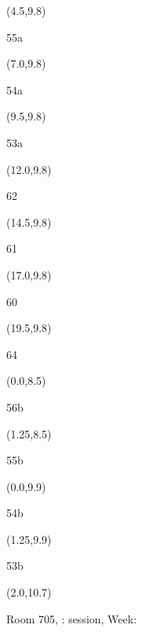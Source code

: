 \documentclass[a4paper]{article}
\newcommand{\myseat}[5]{%
\vspace{-0.1cm} \hspace{-0.5cm}
\parbox[t][2.2cm][t]{3.5cm}{%
\small #1 %
\begin{description}
\vspace{-0.1cm}
\item [ID:] #2
\vspace{-0.1cm}
\item [Team:] #3 \normalsize
\vspace{-0.1cm}
\item \normalsize #4 #5
\vspace{-0.1cm}
\end{description}
}
}
\begin{document}
\begin{CJK}{UTF8}{cyberbit}
\begin{textblock}{2.5}(4.5,9.8)
\textblockcolor{}
\myseat{55a}{}{}{}{}
\end{textblock}

\begin{textblock}{2.5}(7.0,9.8)
\textblockcolor{}
\myseat{54a}{}{}{}{}
\end{textblock}

\begin{textblock}{2.5}(9.5,9.8)
\textblockcolor{}
\myseat{53a}{}{}{}{}
\end{textblock}

\begin{textblock}{2.5}(12.0,9.8)
\textblockcolor{}
\myseat{62}{}{}{}{}
\end{textblock}

\begin{textblock}{2.5}(14.5,9.8)
\textblockcolor{}
\myseat{61}{}{}{}{}
\end{textblock}

\begin{textblock}{2.5}(17.0,9.8)
\textblockcolor{}
\myseat{60}{}{}{}{}
\end{textblock}

\begin{textblock}{2.5}(19.5,9.8)
\textblockcolor{}
\myseat{64}{}{}{}{}
\end{textblock}


\begin{textblock}{1.25}(0.0,8.5)
\textblockcolor{}
\myseat{56b}{}{}{}{}
\end{textblock}

\begin{textblock}{1.25}(1.25,8.5)
\textblockcolor{}
\myseat{55b}{}{}{}{}
\end{textblock}

\begin{textblock}{1.25}(0.0,9.9)
\textblockcolor{}
\myseat{54b}{}{}{}{}
\end{textblock}

\begin{textblock}{1.25}(1.25,9.9)
\textblockcolor{}
\myseat{53b}{}{}{}{}
\end{textblock}


\begin{textblock}{10}(2.0,10.7)
\textblockcolor{}
\parbox[t][2.2cm][t]{9.5cm}{%
\large Room 705, :  session, Week: 
\vspace{-0.3cm} \hspace{-0.5cm}
}
\end{textblock}

\end{CJK}
\end{document}
